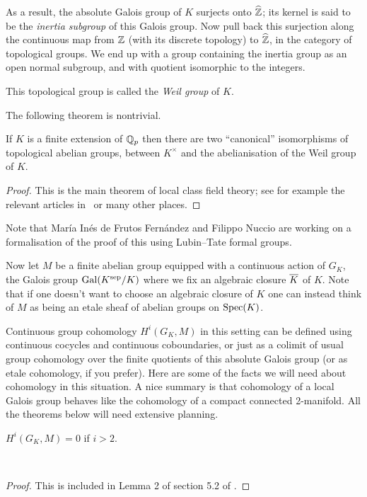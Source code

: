 As a result, the absolute Galois group of $K$ surjects onto $\widehat{\mathbb{Z}}$; its kernel is said to be the \emph{inertia subgroup} of this Galois group. Now pull back this surjection along the continuous map from $\mathbb{Z}$ (with its discrete topology) to $\widehat{\mathbb{Z}}$, in the category of topological groups. We end up with a group containing the inertia group as an open normal subgroup, and with quotient isomorphic to the integers.

\begin{definition}\label{local_Weil_group}\notready This topological group is called the \emph{Weil group} of $K$.
\end{definition}

The following theorem is nontrivial.

\begin{theorem}\label{local_class_field_theory}\notready If $K$ is a finite extension of $\mathbb{Q}_p$ then there are two ``canonical'' isomorphisms of topological abelian groups, between $K^\times$ and the abelianisation of the Weil group of $K$.
\end{theorem}
\begin{proof} This is the main theorem of local class field theory; see for example the relevant articles in~\cite{cf} or many other places.
\end{proof}

Note that Mar\'ia In\'es de Frutos Fern\'andez and Filippo Nuccio are working on a formalisation of the proof of this using Lubin--Tate formal groups.

Now let $M$ be a finite abelian group equipped with a continuous action of $G_K$, the Galois group $\operatorname{Gal}(K^{\operatorname{sep}}/K)$ where we fix an algebraic closure $\overline{K}$ of $K$. Note that if one doesn't want to choose an algebraic closure of $K$ one can instead think of $M$ as being an etale sheaf of abelian groups on $\operatorname{Spec}(K)$.

Continuous group cohomology $H^i(G_K,M)$ in this setting can be defined using continuous cocycles and continuous coboundaries, or just as a colimit of usual group cohomology over the finite quotients of this absolute Galois group (or as etale cohomology, if you prefer). Here are some of the facts we will need about cohomology in this situation. A nice summary is that cohomology of a local Galois group behaves like the cohomology of a compact connected 2-manifold. All the theorems below will need extensive planning.

\begin{theorem} \label{local_galois_coh_dim_two}\notready $H^i(G_K,M)=0$ if $i>2$.
\end{theorem}\
\begin{proof} This is included in Lemma 2 of section 5.2 of \cite{serre-galcoh}.
\end{proof}

